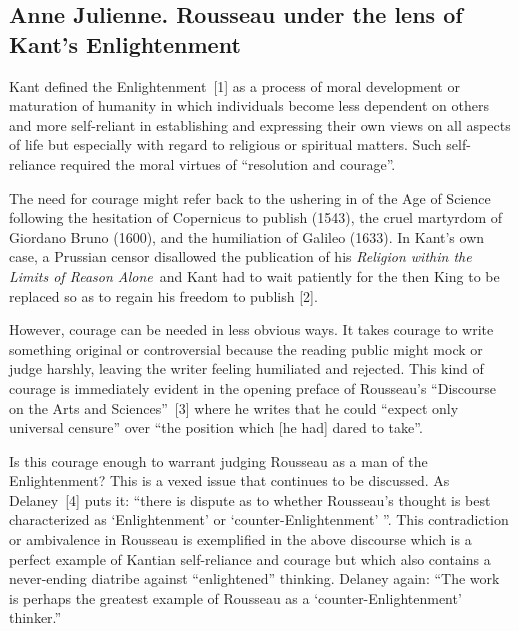 
\subsection*{Anne Julienne. Rousseau under the lens of Kant’s Enlightenment}


\begin{multicols}{2}
Kant defined the Enlightenment~[1] as a process of moral development or maturation of humanity in which individuals
become less dependent on others and more self-reliant in establishing and expressing their own views on all aspects of life but
especially with regard to religious or spiritual matters. Such self-reliance required the moral virtues of ``resolution and
courage''.

The need for courage might refer back to the ushering in of the Age of Science following the hesitation of Copernicus to
publish (1543), the cruel martyrdom of Giordano Bruno (1600), and the humiliation of Galileo (1633). In Kant’s own case, a
Prussian censor disallowed the publication of his \emph{Religion within the Limits of Reason Alone}\ and Kant had to wait patiently for
the then King to be replaced so as to regain his freedom to publish [2].

However, courage can be needed in less obvious ways. It takes courage to write something original or controversial because
the reading public might mock or judge harshly, leaving the writer feeling humiliated and rejected. This kind of courage is
immediately evident in the opening preface of Rousseau’s ``Discourse on the Arts and Sciences''~[3] where he writes that he
could ``expect only universal censure'' over ``the position which [he had] dared to take''.

Is this courage enough to warrant judging Rousseau as a man of the Enlightenment? This is a vexed issue that continues to be
discussed. As Delaney~[4] puts it: ``there is dispute as to whether Rousseau’s thought is best characterized as ‘Enlightenment’
or ‘counter-Enlightenment’ ''. This contradiction or ambivalence in Rousseau is exemplified in the above discourse which is a
perfect example of Kantian self-reliance and courage but which also contains a never-ending diatribe against ``enlightened''
thinking. Delaney again: ``The work is perhaps the greatest example of Rousseau as a ‘counter-Enlightenment’ thinker.''


\end{multicols}
